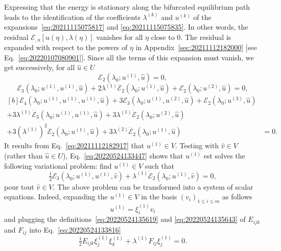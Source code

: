 \documentclass[12pt, final]{scrartcl}
\theoremstyle{definition}
\newcommand{\E}{\mathcal E}
\newcommand{\order}[2][1]{#2^{(#1)}}
\begin{document}
Expressing that the energy is stationary along the bifurcated equilibrium path
leads to the identification of the coefficients $\order[k]\lambda$ and
$\order[k]u$ of the expansions~\eqref{eq:20211115075817} and
\eqref{eq:20211115075835}. In other words, the residual $\E_{, u} [u(\eta), \lambda(\eta)]$
vanishes for all $\eta$ close to $0$. The residual is expanded with respect to
the powers of $\eta$ in Appendix~\ref{sec:20211112182000} [see
Eq.~\eqref{eq:20220107080901}]. Since all the terms of this expansion must
vanish, we get successively, for all $\hat{u} \in U$
\begin{equation}
  \label{eq:20211112182917}
  \E_2(\lambda_0; \order[1]u, \hat{u}) = 0,
\end{equation}
\begin{equation}
  \label{eq:20220524133447}
  \E_3(\lambda_0; \order[1]u, \order[1]u, \hat{u}) + 2\order[1]\lambda\dot{\E}_2(\lambda_0; \order[1]u, \hat{u}) + \E_2(\lambda_0; \order[2]u, \hat{u}) = 0,
\end{equation}
\begin{equation}
  \label{eq:20220708060436}
  \begin{aligned}[b]
    \E_4(\lambda_0; \order[1]u, \order[1]u, \order[1]u, \hat{u}) + 3\E_3(\lambda_0; \order[1]u, \order[2]u, \hat{u}) + \E_2(\lambda_0; \order[3]u, \hat{u})&\\
    + 3\order[1]\lambda\dot{\E}_3(\lambda_0; \order[1]u, \order[1]u, \hat{u}) + 3\order[1]\lambda\dot{\E}_2(\lambda_0;  \order[2]u, \hat{u})&\\
    + 3(\order[1]\lambda)^2\ddot{\E}_2(\lambda_0; \order[1]u, \hat{u}) + 3\order[2]\lambda\dot{\E}_2(\lambda_0; \order[1]u, \hat{u}) & = 0.
  \end{aligned}
\end{equation}
It results from Eq.~\eqref{eq:20211112182917} that $\order[1]u \in V$. Testing
with $\hat{v} \in V$ (rather than $\hat{u} \in U$),
Eq.~\eqref{eq:20220524133447} shows that $\order[1]u$ est solves the following
variational problem: find $\order[1]u \in V$ such that
\begin{equation}
  \label{eq:20220524133816}
  \tfrac{1}{2} \E_3(\lambda_0; \order[1]u, \order[1]u, \hat{v}) + \order[1]\lambda\dot{\E}_2(\lambda_0; \order[1]u, \hat{v}) = 0,
\end{equation}
pour tout $\hat{v} \in V$. The above problem can be transformed into a system of
scalar equations. Indeed, expanding the $\order[1]u \in V$ in the basis
$(v_i)_{1 \leq i \leq m}$ as follows
\begin{equation}
  \label{eq:20220524133944}
  \order[1]u = \order[1]{\xi_i} v_i
\end{equation}
and plugging the definitions~\eqref{eq:20220524135619} and
\eqref{eq:20220524135643} of $E_{ijk}$ and $F_{ij}$ into
Eq.~\eqref{eq:20220524133816}
\begin{equation}
  \label{eq:20220524135036}
  \tfrac{1}{2} E_{ijk} \order[1]{\xi_j} \order[1]{\xi_k} + \order[1]\lambda F_{ij} \order[1]{\xi_j} = 0.
\end{equation}
\end{document}
